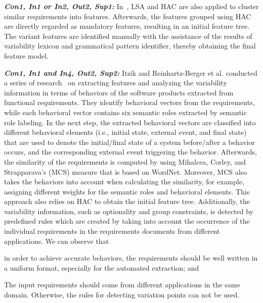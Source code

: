 \documentclass[graybox]{svmult}
\begin{document}
\noindent\textbf{\textit{Con1, In1 or In2, Out2, Sup1:}}
In~\cite{WestonCR09}, LSA and HAC are also applied to cluster similar requirements into features. Afterwards, the features grouped using HAC are directly regarded as mandatory features, resulting in an initial feature tree. The variant features are identified manually with the assistance of the results of variability lexicon and grammatical pattern identifier, thereby obtaining the final feature model.

\noindent\textbf{\textit{Con1, In1 and In4, Out2, Sup2:}} Itzik and Reinhartz-Berger et al. conducted a series of research~\cite{ItzikR14, ItzikRBW16, ReinhartzIW14} on extracting features and analyzing the variability information in terms of behaviors of the software products extracted from functional requirements. They identify behavioral vectors from the requirements, while each behavioral vector contains six semantic roles extracted by semantic role labeling. 
In the next step, the extracted behavioral vectors are classified into different behavioral elements (i.e., initial state, external event, and final state) that are used to denote the initial/final state of a system before/after a behavior occurs, and the corresponding external event triggering the behavior. 
Afterwards, the similarity of the requirements is computed by using Mihalcea, Corley, and Strapparava's (MCS) measure that is based on WordNet. 
Moreover, MCS also takes the behaviors into account when calculating the similarity, for example, assigning different weights for the semantic roles and behavioral elements.
This approach also relies on HAC to obtain the initial feature tree.
Additionally, the variability information, such as optionality and group constraints, is detected by predefined rules which are created by taking into account the occurrence of the individual requirements in the requirements documents from different applications. We can observe that
\begin{inparaenum}[a)]
\item in order to achieve accurate behaviors, the requirements should be well written in a uniform format, especially for the automated extraction; and
\item The input requirements should come from different applications in the same domain. Otherwise, the rules for detecting variation points can not be used.
\end{inparaenum}
\end{document}
